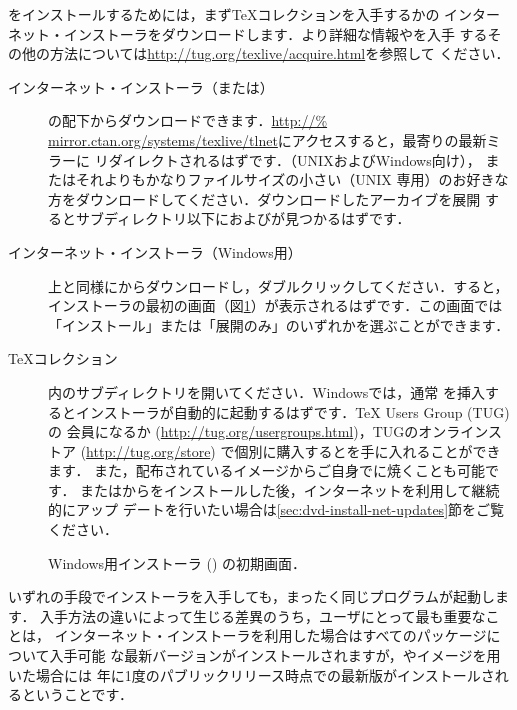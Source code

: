 \documentclass[uplatex,dvipdfmx]{jsarticle}
\begin{document}
\TL をインストールするためには，まず\TeX コレクション\DVD を入手するか\TL の
インターネット・インストーラをダウンロードします．より詳細な情報や\TL を入手
するその他の方法については\url{http://tug.org/texlive/acquire.html}を参照して
ください．
%
\begin{description}
\item[インターネット・インストーラ（または）]
\CTAN の配下からダウンロードできます．\url{http://%
mirror.ctan.org/systems/texlive/tlnet}にアクセスすると，最寄りの最新ミラーに
リダイレクトされるはずです．（UNIXおよびWindows向け），
またはそれよりもかなりファイルサイズの小さい（UNIX%
専用）のお好きな方をダウンロードしてください．ダウンロードしたアーカイブを展開
するとサブディレクトリ以下におよびが見つかるはずです．

\item[インターネット・インストーラ（Windows用）]
上と同様に\CTAN からダウンロードし，ダブルクリックしてください．すると，
インストーラの最初の画面（図\ref{fig:nsis}）が表示されるはずです．この画面では
「インストール」または「展開のみ」のいずれかを選ぶことができます．

\item[\TeX コレクション\DVD]
\DVD 内のサブディレクトリを開いてください．Windowsでは，通常\DVD
を挿入するとインストーラが自動的に起動するはずです．{\TeX} Users Group (TUG) の
会員になるか (\url{http://tug.org/usergroups.html})，TUGのオンラインストア
(\url{http://tug.org/store}) で個別に購入すると\DVD を手に入れることができます．
また，配布されている\ISO イメージからご自身で\DVD に焼くことも可能です．\DVD
または\ISO から\TL をインストールした後，インターネットを利用して継続的にアップ
デートを行いたい場合は\ref{sec:dvd-install-net-updates}節をご覧ください．
\end{description}
%
\begin{figure}[tb]
\caption{Windows用インストーラ () の初期画面．}
\label{fig:nsis}
\end{figure}

いずれの手段でインストーラを入手しても，まったく同じプログラムが起動します．
入手方法の違いによって生じる差異のうち，ユーザにとって最も重要なことは，
インターネット・インストーラを利用した場合はすべてのパッケージについて入手可能
な最新バージョンがインストールされますが，\DVD や\ISO イメージを用いた場合には
年に1度のパブリックリリース時点での最新版がインストールされるということです．
\end{document}
